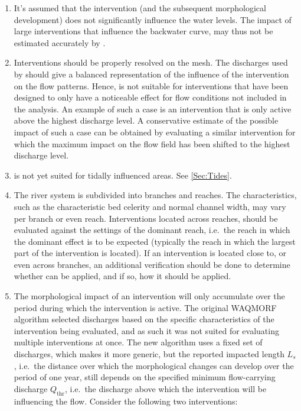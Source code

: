\begin{enumerate}
\item It's assumed that the intervention (and the subsequent morphological development) does not significantly influence the water levels.
The impact of large interventions that influence the backwater curve, may thus not be estimated accurately by \dfmi.

\item Interventions should be properly resolved on the \dflowfm mesh.
The discharges used by \dfmi should give a balanced representation of the influence of the intervention on the flow patterns.
Hence, \dfmi is not suitable for interventions that have been designed to only have a noticeable effect for flow conditions not included in the analysis.
An example of such a case is an intervention that is only active above the highest discharge level.
A conservative estimate of the possible impact of such a case can be obtained by evaluating a similar intervention for which the maximum impact on the flow field has been shifted to the highest discharge level.

\item \dfastmi is not yet suited for tidally influenced areas.
See \autoref{Sec:Tides}.

\item \label{reach_bnd} The river system is subdivided into branches and reaches.
The characteristics, such as the characteristic bed celerity and normal channel width, may vary per branch or even reach.
Interventions located across reaches, should be evaluated against the settings of the dominant reach, i.e.~the reach in which the dominant effect is to be expected (typically the reach in which the largest part of the intervention is located).
If an intervention is located close to, or even across branches, an additional verification should be done to determine whether \dfmi can be applied, and if so, how it should be applied.

\item The morphological impact of an intervention will only accumulate over the period during which the intervention is active.
The original WAQMORF algorithm selected discharges based on the specific characteristics of the intervention being evaluated, and as such it was not suited for evaluating multiple interventions at once.
The new algorithm uses a fixed set of discharges, which makes it more generic, but the reported impacted length $L_s$, i.e.~the distance over which the morphological changes can develop over the period of one year, still depends on the specified minimum flow-carrying discharge $Q_\text{thr}$, i.e.~the discharge above which the intervention will be influencing the flow.
Consider the following two interventions:


\end{enumerate}
